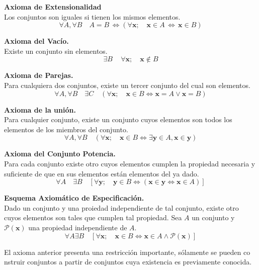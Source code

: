 \begin{axiom} \textbf{Axioma de Extensionalidad}\\
Los conjuntos son iguales si tienen los mismos elementos.
    \[
        \forall A, \forall B \quad A = B \, \Longleftrightarrow (\forall \mathbf{x};  \quad \mathbf{x} \in A \, \Longleftrightarrow
        \, \mathbf{x} \in B)
    \]
\end{axiom}
\begin{axiom} \textbf{Axioma del Vacío.}\\
Existe un conjunto sin elementos.
    \[
    \exists B \, \quad \forall \mathbf{x}; \quad \mathbf{x} \notin B
    \]

\end{axiom}

\begin{axiom} \textbf{Axioma de Parejas.}\\
    Para cualquiera dos conjuntos, existe un tercer conjunto del cual son
    elementos.
   \[
        \forall A, \forall B \quad \exists C  \quad (\forall \mathbf{x}; \quad \mathbf{x} \in B \Longleftrightarrow \mathbf{x} = A \vee \mathbf{x}=B)
    \]
\end{axiom}

\begin{axiom} \textbf{Axioma de la unión.}\\
    Para cualquier conjunto, existe un conjunto cuyos elementos son todos los
    elementos de los miembros del conjunto.
    \[
        \forall A, \forall B \quad (\forall \mathbf{x}; \quad \mathbf{x}\in B \Longleftrightarrow \exists \mathbf{y} \in A, \mathbf{x} \in \mathbf{y})
    \]
\end{axiom}
\begin{axiom} \textbf{Axioma del Conjunto Potencia.}\\
    Para cada conjunto existe otro cuyos elementos cumplen la propiedad necesaria y suficiente de 
    que en sus elementos están elementos del ya dado.
    \[
        \forall A \quad \exists B \quad [\forall \mathbf{y}; \quad \mathbf{y} \in B \Longleftrightarrow ( \mathbf{x} \in \mathbf{y} \Longleftrightarrow \mathbf{x} \in A)]
    \]
\end{axiom}
\begin{axiom} \textbf{Esquema Axiomático de Especificación.}\\
    Dado un conjunto y una proiedad independiente de tal conjunto, existe otro cuyos elementos son tales que 
    cumplen tal propiedad. Sea $A$ un conjunto y $\mathcal{P}(\mathbf{x})$ una propiedad independiente de $A$.
    \[
        \forall A \exists B \quad [\forall \mathbf{x}; \quad \mathbf{x} \in B \Longleftrightarrow \mathbf{x} \in A \wedge \mathcal{P}(\mathbf{x}) ]
   \]
\end{axiom}
El axioma anterior presenta una restricción importante, sólamente se pueden
co nstruir conjuntos a partir de conjuntos cuya existencia es previamente
conocida. \\


